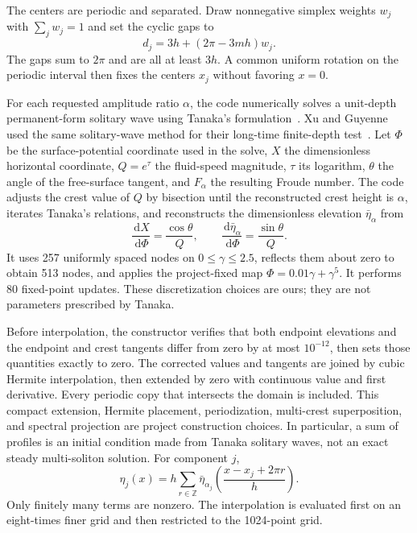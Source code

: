 \documentclass[10pt]{article}
\newcommand{\dd}{\,\mathrm d}
\begin{document}
The centers are periodic and separated.  Draw nonnegative simplex weights
$w_j$ with $\sum_jw_j=1$ and set the cyclic gaps to
\begin{equation}
  d_j=3h+(2\pi-3mh)w_j.
  \label{eq:tanaka-gaps}
\end{equation}
The gaps sum to $2\pi$ and are all at least $3h$.  A common uniform rotation
on the periodic interval then fixes the centers $x_j$ without favoring
$x=0$.

For each requested amplitude ratio $\alpha$, the code numerically solves a
unit-depth permanent-form solitary wave using Tanaka's
formulation~\cite{tanaka1986}.  Xu and Guyenne used the same solitary-wave method for
their long-time finite-depth test~\cite{xu2009}.  Let $\Phi$ be the
surface-potential coordinate used in the solve, $X$ the dimensionless
horizontal coordinate, $Q=e^\tau$ the fluid-speed magnitude, $\tau$ its
logarithm, $\theta$ the angle of the free-surface tangent, and $F_\alpha$ the
resulting Froude number.  The code adjusts the crest value of $Q$ by bisection
until the reconstructed crest height is $\alpha$, iterates Tanaka's
relations, and reconstructs the dimensionless elevation
$\bar\eta_\alpha$ from
\[
  \frac{\dd X}{\dd\Phi}=\frac{\cos\theta}{Q},
  \qquad
  \frac{\dd\bar\eta_\alpha}{\dd\Phi}
  =\frac{\sin\theta}{Q}.
\]
It uses 257 uniformly spaced nodes on \(0\leq\gamma\leq2.5\), reflects them
about zero to obtain 513 nodes, and applies the project-fixed map
\(\Phi=0.01\gamma+\gamma^5\).  It performs 80 fixed-point updates.  These
discretization choices are ours; they are not parameters prescribed by
Tanaka.

Before interpolation, the constructor verifies that both endpoint elevations
and the endpoint and crest tangents differ from zero by at most $10^{-12}$,
then sets those quantities exactly to zero.  The corrected values and tangents
are joined by cubic Hermite interpolation, then extended by zero with
continuous value and first derivative.  Every
periodic copy that intersects the domain is included.  This compact
extension, Hermite placement, periodization, multi-crest superposition, and
spectral projection are project construction choices.  In particular, a sum
of profiles is an initial condition made from Tanaka solitary waves, not an
exact steady multi-soliton solution.
For component $j$,
\begin{equation}
  \eta_j(x)
  =
  h\sum_{r\in\mathbb Z}
  \bar\eta_{\alpha_j}
  \!\left(\frac{x-x_j+2\pi r}{h}\right).
  \label{eq:tanaka-elevation}
\end{equation}
Only finitely many terms are nonzero.  The interpolation is evaluated first
on an eight-times finer grid and then restricted to the 1024-point grid.
\end{document}
